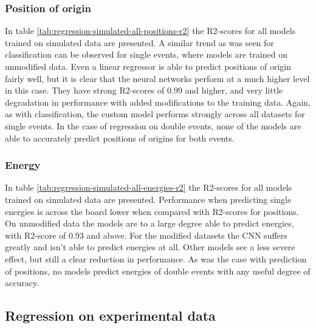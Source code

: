\subsubsection{Position of origin}
In table \ref{tab:regression-simulated-all-positions-r2} the R2-scores for all models
trained on simulated data are presented. A similar trend as was seen for classification
can be observed for single events, where models are trained on unmodified data. Even
a linear regressor is able to predict positions of origin fairly well, but it is clear
that the neural networks perform at a much higher level in this case. They have strong
R2-scores of 0.99 and higher, and very little degradation in performance with added 
modifications to the training data. Again, as with classification, the custom model
performs strongly across all datasets for single events.
In the case of regression on double events, none of the models are able to accurately
predict positions of origins for both events.

\subsubsection{Energy}
In table \ref{tab:regression-simulated-all-energies-r2} the R2-scores for all models
trained on simulated data are presented.
Performance when predicting single energies is across the board lower when compared with
R2-scores for positions. On unmodified data the models are to a large degree able to
predict energies, with R2-score of 0.93 and above. For the modified datasets the CNN
suffers greatly and isn't able to predict energies at all. Other models see a less
severe effect, but still a clear reduction in performance.
As was the case with prediction of positions, no models predict energies
of double events with any useful degree of accuracy.


\subsection{Regression on experimental data}

